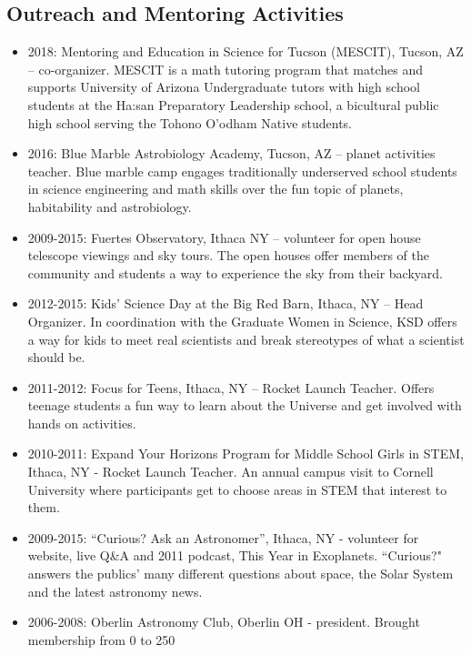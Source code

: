 \documentclass[11pt, oneside]{article}   	%
\begin{document}
\subsection*{Outreach and Mentoring Activities}
\begin{itemize}[noitemsep]
    \item 2018: Mentoring and Education in Science for Tucson (MESCIT), Tucson, AZ -- co-organizer. MESCIT is a math tutoring program that matches and supports University of Arizona Undergraduate tutors with high school students at the Ha:san Preparatory Leadership school, a bicultural public high school serving the Tohono O'odham Native students.
    \item 2016: Blue Marble Astrobiology Academy, Tucson, AZ -- planet activities teacher. Blue marble camp engages traditionally underserved school students in science engineering and math skills over the fun topic of planets, habitability and astrobiology.
    \item 2009-2015: Fuertes Observatory, Ithaca NY -- volunteer for open house telescope viewings and sky tours. The open houses offer members of the community and students a way to experience the sky from their backyard.
    \item 2012-2015: Kids' Science Day at the Big Red Barn, Ithaca, NY -- Head Organizer. In coordination with the Graduate Women in Science, KSD offers a way for kids to meet real scientists and break stereotypes of what a scientist should be.
    \item 2011-2012: Focus for Teens, Ithaca, NY -- Rocket Launch Teacher. Offers teenage students a fun way to learn about the Universe and get involved with hands on activities.
    \item 2010-2011: Expand Your Horizons Program for Middle School Girls in STEM, Ithaca, NY - Rocket Launch Teacher. An annual campus visit to Cornell University where participants get to choose areas in STEM that interest to them.
    \item 2009-2015: ``Curious? Ask an Astronomer'', Ithaca, NY - volunteer for website, live Q\&A and 2011 podcast, This Year in Exoplanets. ``Curious?" answers the publics' many different questions about space, the Solar System and the latest astronomy news.
    \item 2006-2008: Oberlin Astronomy Club, Oberlin OH - president. Brought membership from 0 to 250
 \end{itemize}
\end{document}
